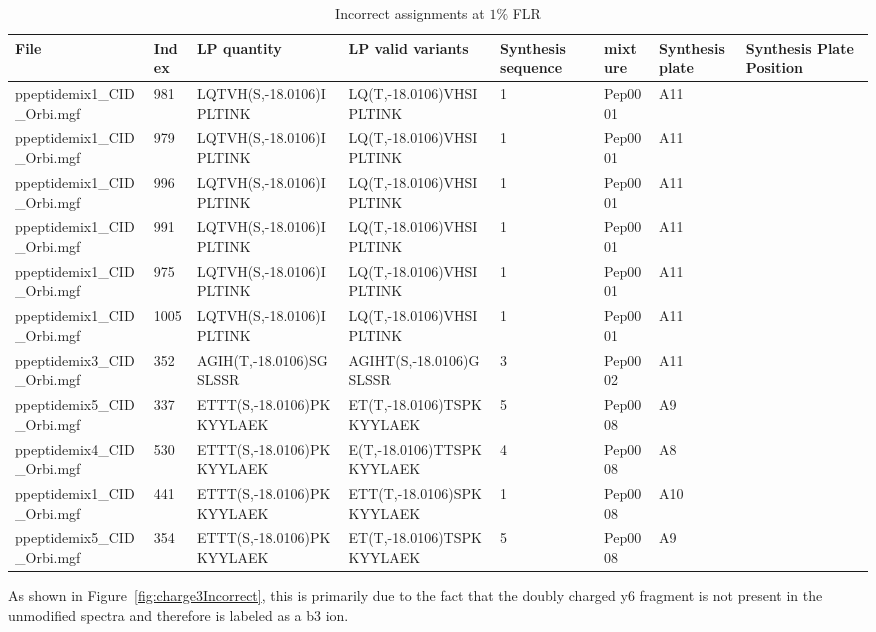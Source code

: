 \begin{table}[h]
\centering
\caption{Incorrect assignments at $1\%$ FLR}\label{tbl:incorrectAssignments}
\resizebox{7in}{!} {
\begin{tabular}{|l|l|l|l|l|l|l|l|}
File & Index & LP quantity & LP valid variants & Synthesis sequence & mixture & Synthesis plate & Synthesis Plate Position \\
\hline
ppeptidemix1\_CID\_Orbi.mgf & 981 & LQTVH(S,-18.0106)IPLTINK & LQ(T,-18.0106)VHSIPLTINK & 1 & Pep0001 & A11 \\
ppeptidemix1\_CID\_Orbi.mgf & 979 & LQTVH(S,-18.0106)IPLTINK & LQ(T,-18.0106)VHSIPLTINK & 1 & Pep0001 & A11 \\
ppeptidemix1\_CID\_Orbi.mgf & 996 & LQTVH(S,-18.0106)IPLTINK & LQ(T,-18.0106)VHSIPLTINK & 1 & Pep0001 & A11 \\
ppeptidemix1\_CID\_Orbi.mgf & 991 & LQTVH(S,-18.0106)IPLTINK & LQ(T,-18.0106)VHSIPLTINK & 1 & Pep0001 & A11 \\
ppeptidemix1\_CID\_Orbi.mgf & 975 & LQTVH(S,-18.0106)IPLTINK & LQ(T,-18.0106)VHSIPLTINK & 1 & Pep0001 & A11 \\
ppeptidemix1\_CID\_Orbi.mgf & 1005 & LQTVH(S,-18.0106)IPLTINK & LQ(T,-18.0106)VHSIPLTINK & 1 & Pep0001 & A11 \\
ppeptidemix3\_CID\_Orbi.mgf & 352 & AGIH(T,-18.0106)SGSLSSR & AGIHT(S,-18.0106)GSLSSR & 3 & Pep0002 & A11 \\
ppeptidemix5\_CID\_Orbi.mgf & 337 & ETTT(S,-18.0106)PKKYYLAEK & ET(T,-18.0106)TSPKKYYLAEK & 5 & Pep0008 & A9 \\
ppeptidemix4\_CID\_Orbi.mgf & 530 & ETTT(S,-18.0106)PKKYYLAEK & E(T,-18.0106)TTSPKKYYLAEK & 4 & Pep0008 & A8 \\
ppeptidemix1\_CID\_Orbi.mgf & 441 & ETTT(S,-18.0106)PKKYYLAEK & ETT(T,-18.0106)SPKKYYLAEK & 1 & Pep0008 & A10 \\
ppeptidemix5\_CID\_Orbi.mgf & 354 & ETTT(S,-18.0106)PKKYYLAEK & ET(T,-18.0106)TSPKKYYLAEK & 5 & Pep0008 & A9 \\
\hline
\end{tabular}
}
\end{table}

As shown in Figure~\ref{fig:charge3Incorrect}, this is primarily due to the fact that the doubly charged y6 fragment is not present in the unmodified spectra and therefore is labeled as a b3 ion.

